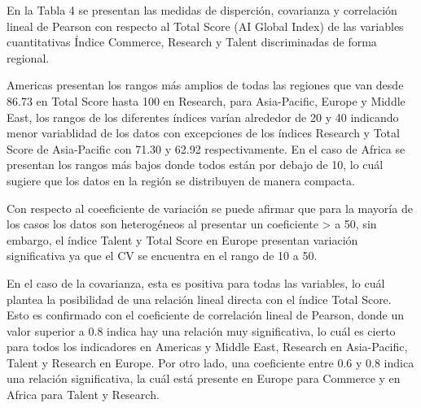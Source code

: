 \documentclass[
]{article}
\begin{document}
\begin{multicols}{2}

En la Tabla 4 se presentan las medidas de disperción, covarianza y correlación lineal de Pearson con respecto al Total Score (AI Global Index) de las variables cuantitativas Índice Commerce, Research y Talent discriminadas de forma regional. 

Americas presentan los rangos más amplios de todas las regiones que van desde 86.73 en Total Score hasta 100 en Research, para Asia-Pacific, Europe y Middle East, los rangos de los diferentes índices varían alrededor de 20 y 40 indicando menor variablidad de los datos con excepciones de los índices Research y Total Score de Asia-Pacific con 71.30 y  62.92 respectivamente. En el caso de Africa se presentan los rangos más bajos donde todos están por debajo de 10, lo cuál sugiere que los datos en la región se distribuyen de manera compacta.

Con respecto al coeeficiente de variación se puede afirmar que para la mayoría de los casos los datos son heterogéneos al presentar un coeficiente > a 50, sin embargo, el índice Talent y Total Score en Europe presentan variación significativa ya que el CV se encuentra en el rango de 10 a 50.

En el caso de la covarianza, esta es positiva para todas las variables, lo cuál plantea la posibilidad de una relación lineal directa con el índice Total Score. Esto es confirmado con el coeficiente de correlación lineal de Pearson, donde un valor superior a 0.8 indica hay una relación muy significativa, lo cuál es cierto para todos los indicadores en Americas y Middle East, Research en Asia-Pacific, Talent y Research en Europe. Por otro lado, una coeficiente entre 0.6 y 0.8 indica una relación significativa, la cuál está presente en Europe para Commerce y en Africa para Talent y Research.


\end{multicols}
\end{document}
